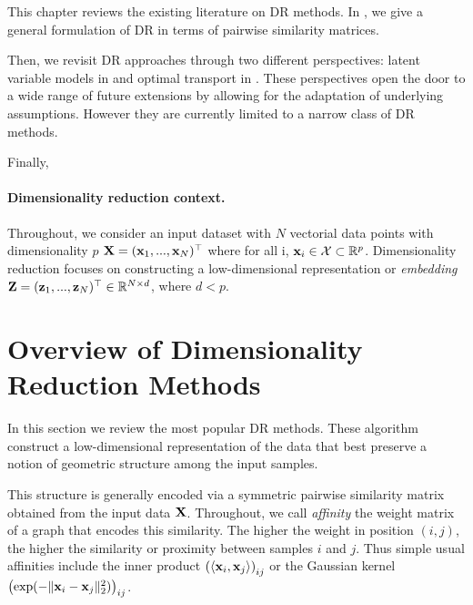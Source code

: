 \newpage

This chapter reviews the existing literature on DR methods. In , we give a general formulation of DR in terms of pairwise similarity matrices. 

Then, we revisit DR approaches through two different perspectives:
latent variable models in  and optimal transport in . These perspectives open the door to a wide range of future extensions by allowing for the adaptation of underlying assumptions. However they are currently limited to a narrow class of DR methods.

Finally, 

\paragraph{Dimensionality reduction context.}
Throughout, we consider an input dataset with $N$ vectorial data points with dimensionality $p$ \ie ${\mathbf{X}} = ({\mathbf{x}}_1, ..., {\mathbf{x}}_N) ^\top$ where for all i, ${\mathbf{x}}_i \in \mathcal{X} \subset \mathbb{R}^{p}$. Dimensionality reduction focuses on constructing a low-dimensional representation or \emph{embedding} ${\mathbf{Z}} = ({\mathbf{z}}_1, ..., {\mathbf{z}}_N)^\top \in \mathbb{R}^{N \times d}$, where $d< p$.

\section{Overview of Dimensionality Reduction Methods}\label{sec:background_dr}

In this section we review the most popular DR methods. These algorithm construct a low-dimensional representation of the data that best preserve a notion of geometric structure among the input samples. 

This structure is generally encoded via a symmetric pairwise similarity matrix obtained from the input data ${\mathbf{X}}$. Throughout, we call \emph{affinity} the weight matrix of a graph that encodes this similarity. The higher the weight in position $(i,j)$, the
higher the similarity or proximity between samples $i$ and $j$. Thus simple usual affinities include the inner product $\left( \langle {\mathbf{x}}_i, {\mathbf{x}}_j \rangle \right)_{ij}$ or the Gaussian kernel $\left( \exp(-\|{\mathbf{x}}_i - {\mathbf{x}}_j\|_2^2) \right)_{ij}$.





